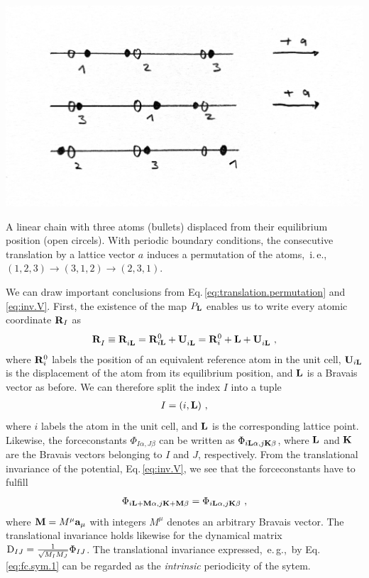 \begin{marginfigure}
	\centering
	\includegraphics[width=\textwidth]{./data/sketches/permutation1.jpg}
	\caption{ A linear chain with three atoms (bullets) displaced from their equilibrium position (open circels). With periodic boundary conditions, the consecutive translation by a lattice vector $a$ induces a permutation of the atoms,~i.\,e.,~$(1, 2 , 3) \to (3, 1, 2) \to (2, 3, 1)$.}
	\label{fig:translation.permutation}
\end{marginfigure}

We can draw important conclusions from Eq.\,\eqref{eq:translation.permutation} and \eqref{eq:inv.V}. First, the existence of the map $P_{\bf L}$ enables us to write every atomic coordinate ${\bf R}_I$ as
\begin{align}
	\fD {\bf R}_I \equiv \fD {\bf R}_{i {\bf L}} 
		= {\bf R}^0_{i \b L} + \fD {\bf U}_{i {\bf L}}
		= {\bf R}^0_i + {\bf L} + \fD {\bf U}_{i {\bf L}}~,
	\label{eq:R_iL}
\end{align}
where ${\bf R}^0_i$ labels the position of an equivalent reference atom in the unit cell, ${\bf U}_{i {\bf L}}$ is the displacement of the atom from its equilibrium position, and $\bf L$ is a Bravais vector as before.
We can therefore split the index $I$ into a tuple 
\begin{align}
	I = (i, {\bf L})~,
	\label{eq:I}
\end{align}
where $i$ labels the atom in the unit cell, and $\bf L$ is the corresponding lattice point. Likewise, the forceconstants $\Phi_{I \alpha, J \beta}$ can be written as $\Phi_{i {\bf L} \alpha, j {\bf K} \beta}$, where $\bf L$ and ${\bf K}$ are the Bravais vectors belonging to $I$ and $J$, respectively. From the translational invariance of the potential, Eq.\,\eqref{eq:inv.V}, we see that the forceconstants have to fulfill
\begin{align}
	\Phi_{i {\bf L} + \b M \alpha, j {\bf K} + \b M \beta} 
		= \Phi_{i {\bf L} \alpha, j {\bf K} \beta}~,
	\label{eq:fc.sym.1}
\end{align}
where ${\bf M} = M^\mu {\bf a}_\mu$ with integers $M^\mu$ denotes an arbitrary Bravais vector. The translational invariance holds likewise for the dynamical matrix ${\rm D}_{IJ} = \frac{1}{\sqrt{M_I M_J}} \Phi_{IJ}$. The translational invariance expressed,~e.\,g.,~by Eq.\,\eqref{eq:fc.sym.1} can be regarded as the \emph{intrinsic} periodicity of the sytem.


